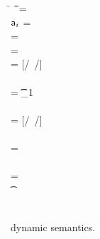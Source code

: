 \documentclass[runnningheads]{tex/llncs}
\begin{document}
\begin{figure}[!h]
\noindent\hrulefill

\medskip\small

\begin{minipage}{\textwidth}
\small        
\begin{tabbing}
  \K\HS \New{} \HS\= \s~ \HS \=\Red\HS \= \K \HS\= \ap \HS\= \sp\HS \= \WHERE\HS\= \fresh\ap \HS\HS\HS\HS\HS\HS\HS\=  \sp = {\Map{}}
\\
\K\HS \FReadR\a{\f[i]} \> \s           \>\Red\>     \K \>$\a[i]$ \> \s  \> \WHERE \>\App\s\a=\obj{}
\\
\K\HS {\FWriteR\a{\f[i]}\ap} \> \s     \>\Red\>     \K \> \ap \> \sp \>  \WHERE \>\App\s\a=\obj{} \HS  \\ \> \> \> \> \> \> \> \sp = \Map{}
\\
\K\HS{\KCall\a\m\ap\t\tp} \> \s      \>\Red\>     \K \>  \ep \> \s \> \WHERE\> \ep = {[\a/\this~{\ap/\x}]\e} \HS \\ \> \> \> \> \> \> \> \Mdef\m{}\e\In \App\K\C  \\ \> \> \> \> \> \> \>  \App\s\a=\obj{} \> \StrSub {\emptyset}\K\t {\t_{1}} \\ 
\> \> \> \> \> \> \> \StrSub {\emptyset} \tp
\\
 \K\HS {\DynCall\a\m\ap}\> \s        \>\Red\>    \K \> \ep \> \s \>  \WHERE\> \ep = {[\a/\this~{\ap/\x}]\e}\HS \\ \> \> \> \> \> \> \> \Mdef\m\x\any\any\e \In \App\K\C \\ \> \> \> \> \> \> \> \App\s\a=\obj{} 
\\
 \K\HS {\SubCast \any\a} \> \s       \>\Red\>   \K \> \a \> \s
\\
 \K\HS {\SubCast \D\a} \> \s        \>\Red\>    \K \> \a \> \s \>  \WHERE\> \StrSub {\emptyset}\K\C \D \>\App\s\a=\obj{} 
\\
 \K\HS {\BehCast \t\a} \> \s         \>\Red\>   \Kp \> \ap \> \sp \> \WHERE\> \behcast \a\t\s\K \Kp\ap\sp    
\\
\K \HS \EM{\EE[\e]} \> \s            \>\Red\>   \Kp \> \EM{\EE[\ep]} \> \sp \> \WHERE \> \K~\e~\s \Red~\Kp~\ep~\sp
\end{tabbing}
\end{minipage}

\medskip
\hrulefill
\caption{\kafka dynamic semantics.}\label{fig:semantics}
\end{figure}
\end{document}
